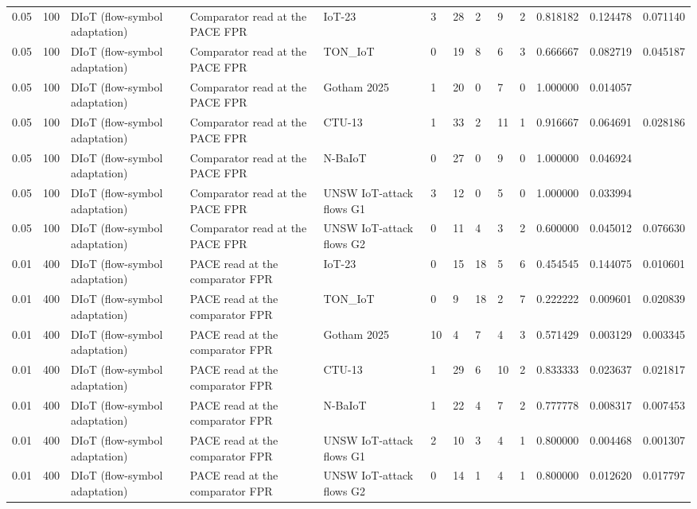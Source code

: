 \begin{tabular}{lllllllllllll}
0.05 & 100 & DIoT (flow-symbol adaptation) & Comparator read at the PACE FPR & IoT-23 & 3 & 28 & 2 & 9 & 2 & 0.818182 & 0.124478 & 0.071140 \\
0.05 & 100 & DIoT (flow-symbol adaptation) & Comparator read at the PACE FPR & TON\_IoT & 0 & 19 & 8 & 6 & 3 & 0.666667 & 0.082719 & 0.045187 \\
0.05 & 100 & DIoT (flow-symbol adaptation) & Comparator read at the PACE FPR & Gotham 2025 & 1 & 20 & 0 & 7 & 0 & 1.000000 & 0.014057 &  \\
0.05 & 100 & DIoT (flow-symbol adaptation) & Comparator read at the PACE FPR & CTU-13 & 1 & 33 & 2 & 11 & 1 & 0.916667 & 0.064691 & 0.028186 \\
0.05 & 100 & DIoT (flow-symbol adaptation) & Comparator read at the PACE FPR & N-BaIoT & 0 & 27 & 0 & 9 & 0 & 1.000000 & 0.046924 &  \\
0.05 & 100 & DIoT (flow-symbol adaptation) & Comparator read at the PACE FPR & UNSW IoT-attack flows G1 & 3 & 12 & 0 & 5 & 0 & 1.000000 & 0.033994 &  \\
0.05 & 100 & DIoT (flow-symbol adaptation) & Comparator read at the PACE FPR & UNSW IoT-attack flows G2 & 0 & 11 & 4 & 3 & 2 & 0.600000 & 0.045012 & 0.076630 \\
0.01 & 400 & DIoT (flow-symbol adaptation) & PACE read at the comparator FPR & IoT-23 & 0 & 15 & 18 & 5 & 6 & 0.454545 & 0.144075 & 0.010601 \\
0.01 & 400 & DIoT (flow-symbol adaptation) & PACE read at the comparator FPR & TON\_IoT & 0 & 9 & 18 & 2 & 7 & 0.222222 & 0.009601 & 0.020839 \\
0.01 & 400 & DIoT (flow-symbol adaptation) & PACE read at the comparator FPR & Gotham 2025 & 10 & 4 & 7 & 4 & 3 & 0.571429 & 0.003129 & 0.003345 \\
0.01 & 400 & DIoT (flow-symbol adaptation) & PACE read at the comparator FPR & CTU-13 & 1 & 29 & 6 & 10 & 2 & 0.833333 & 0.023637 & 0.021817 \\
0.01 & 400 & DIoT (flow-symbol adaptation) & PACE read at the comparator FPR & N-BaIoT & 1 & 22 & 4 & 7 & 2 & 0.777778 & 0.008317 & 0.007453 \\
0.01 & 400 & DIoT (flow-symbol adaptation) & PACE read at the comparator FPR & UNSW IoT-attack flows G1 & 2 & 10 & 3 & 4 & 1 & 0.800000 & 0.004468 & 0.001307 \\
0.01 & 400 & DIoT (flow-symbol adaptation) & PACE read at the comparator FPR & UNSW IoT-attack flows G2 & 0 & 14 & 1 & 4 & 1 & 0.800000 & 0.012620 & 0.017797 \\

\end{tabular}

